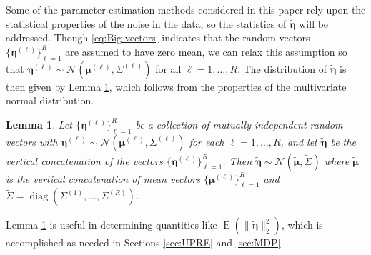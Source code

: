 \documentclass[12pt]{article}
\DeclareMathOperator{\diag}{diag}	%
\newcommand{\noise}{\eta}	%
\newcommand{\noiseVec}{\bm{\noise}}	%
\DeclareMathOperator{\E}{E}	%
\newtheorem{lemma}{Lemma}[section]
\begin{document}
 
Some of the parameter estimation methods considered in this paper rely upon the statistical properties of the noise in the data, so the statistics of $\widetilde{\noiseVec}$ will be addressed. Though \eqref{eq:Big vectors} indicates that the random vectors $\{\noiseVec^{(\ell)}\}_{\ell=1}^R$ are assumed to have zero mean, we can relax this assumption so that $\noiseVec^{(\ell)} \sim \mathcal{N}(\bm{\mu}^{(\ell)},\Sigma^{(\ell)})$ for all $\ell = 1,\ldots,R$. The distribution of $\widetilde{\noiseVec}$ is then given by Lemma \ref{lem:Concatenation of Normal Noise}, which follows from the properties of the multivariate normal distribution. 
\begin{lemma}
\label{lem:Concatenation of Normal Noise}
Let $\{\noiseVec^{(\ell)}\}_{\ell=1}^R$ be a collection of mutually independent random vectors with $\noiseVec^{(\ell)} \sim \mathcal{N}(\bm{\mu}^{(\ell)},\Sigma^{(\ell)})$ for each $\ell = 1,\ldots,R$, and let $\widetilde{\noiseVec}$ be the vertical concatenation of the vectors $\{\noiseVec^{(\ell)}\}_{\ell=1}^R$. Then $\widetilde{\noiseVec} \sim \mathcal{N}(\widetilde{\bm{\mu}},\widetilde{\Sigma})$ where $\widetilde{\bm{\mu}}$ is the vertical concatenation of mean vectors $\{\bm{\mu}^{(\ell)}\}_{\ell=1}^R$ and $\widetilde{\Sigma} = \diag(\Sigma^{(1)},\ldots,\Sigma^{(R)})$.
\end{lemma}
\noindent Lemma \ref{lem:Concatenation of Normal Noise} is useful in determining quantities like $\E(\|\widetilde{\noiseVec}\|_2^2)$, which is accomplished as needed in Sections \ref{sec:UPRE} and \ref{sec:MDP}.
\end{document}
